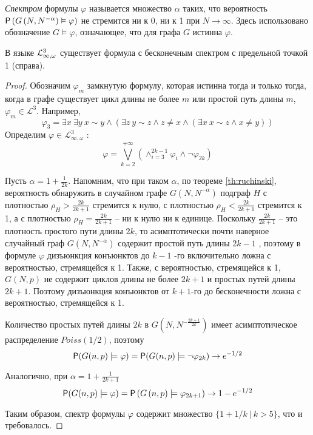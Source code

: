 
\Def \textit{Спектром} формулы $\varphi$ называется множество $\alpha$ таких, что вероятность $\P\left( G\left(N, N^{-\alpha}\right) \vDash \varphi  \right)$ не стремится ни к 0, ни к 1 при $N \rightarrow \infty$.
Здесь использовано обозначение $G \vDash \varphi$, означающее, что для графа $G$ истинна $\varphi$.

\begin{theorem}
В языке $\LL^3_{\infty, \omega}$ существует формула с бесконечным спектром с предельной точкой 1 (справа).
\end{theorem}
\begin{proof}
Обозначим $\varphi_m$ замкнутую формулу, которая истинна тогда и только тогда, когда в графе существует цикл длины не более $m$  или простой путь длины $m$,  $\varphi_m \in \mathcal{L}^3$. Например,
\[
\varphi_3 = \exists x ~\exists y ~
 x \sim y  \wedge \left( \exists z ~ y \sim z \wedge  z \neq x 
\wedge \left(\exists x ~ x \sim z \wedge x \neq y
\right) \right) 
\]
Определим $\varphi \in \mathcal{L}^3_{\infty, \omega}$ :
\[
\varphi = \bigvee_{k = 2}^{+\infty}\left(
\wedge_{i=3}^{2k-1} \varphi_{i}  \wedge \neg \varphi_{2k} \right)
\]

Пусть $\alpha = 1 + \frac{1}{2k}$.
Напомним, что при таком $\alpha$, по теореме \ref{th:ruchinski}, вероятность обнаружить в случайном графе $G(N, N^{-\alpha})$ подграф $H$ с плотностью $\rho_H > \frac{2k}{2k+1}$ стремится к нулю, с плотностью $\rho_H < \frac{2k}{2k+1}$ стремится к 1, а с плотностью $\rho_H = \frac{2k}{2k+1}$ -- ни к нулю ни к единице.
Поскольку $\frac{2k}{2k+1}$ -- это плотность простого пути длины $2k$, то асимптотически почти наверное случайный граф $G(N, N^{-\alpha})$ содержит простой путь длины $2k-1$ , поэтому в формуле $\varphi$ дизъюнкция конъюнктов до $k-1$ -го включительно ложна с вероятностью, стремящейся к 1.
Также, с вероятностью, стремящейся к 1, $G(N, p)$ не содержит циклов длины не более $2k+1$ и простых путей длины $2k+1$.
Поэтому дизъюнкция конъюнктов от $k+1$-го до бесконечности ложна с вероятностью, стремящейся к 1.

Количество простых путей длины $2k$ в $G(N, N^{-\frac{2k+1}{2k}})$ имеет асимптотическое распределение $Poiss(1/2)$, поэтому
$$
\P(G(n, p) \models \varphi) = 
\P(G(n, p) \models \neg \varphi_{2k}) \rightarrow e^{-1/2}
$$

Аналогично, при $\alpha = 1 + \frac{1}{2k+1}$ 
$$\P(G(n, p) \models \varphi) = 
\P\left(G\left(n, p \right) \models  \varphi_{2k+1}\right) \rightarrow 1 - e^{-1/2}$$

Таким образом, спектр формулы $\varphi$ содержит множество $\{1 + 1/k ~|~ k > 5 \}$, что и требовалось.
\end{proof}